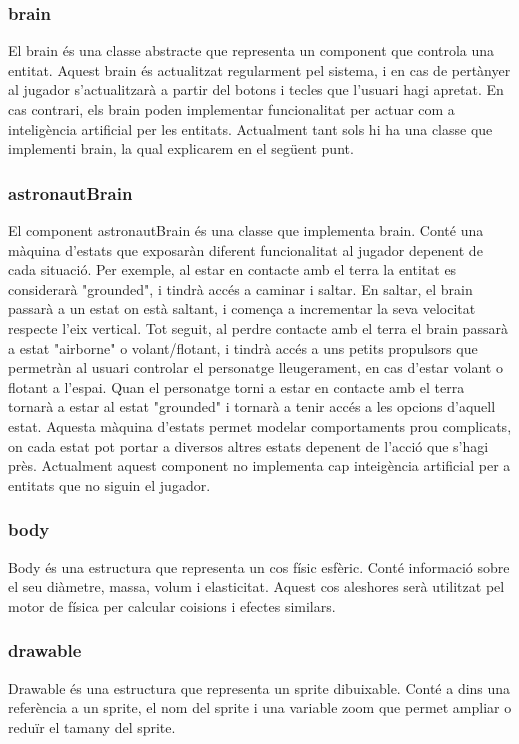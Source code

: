\subsubsection{brain}
El brain és una classe abstracte que representa un component que controla una entitat. Aquest brain és actualitzat regularment pel sistema, i en cas de pertànyer al jugador s'actualitzarà a partir del botons i tecles que l'usuari hagi apretat.
En cas contrari, els brain poden implementar funcionalitat per actuar com a inteligència artificial per les entitats.
Actualment tant sols hi ha una classe que implementi brain, la qual explicarem en el següent punt.
\subsubsection{astronautBrain}
El component astronautBrain és una classe que implementa brain. Conté una màquina d'estats que exposaràn diferent funcionalitat al jugador depenent de cada situació.
Per exemple, al estar en contacte amb el terra la entitat es considerarà "grounded", i tindrà accés a caminar i saltar. 
En saltar, el brain passarà a un estat on està saltant, i comença a incrementar la seva velocitat respecte l'eix vertical.
Tot seguit, al perdre contacte amb el terra el brain passarà a estat "airborne" o volant/flotant, i tindrà accés a uns petits propulsors que permetràn al usuari controlar el personatge lleugerament, en cas d'estar volant o flotant a l'espai.
Quan el personatge torni a estar en contacte amb el terra tornarà a estar al estat "grounded" i tornarà a tenir accés a les opcions d'aquell estat.
Aquesta màquina d'estats permet modelar comportaments prou complicats, on cada estat pot portar a diversos altres estats depenent de l'acció que s'hagi près.
Actualment aquest component no implementa cap inte\lgem igència artificial per a entitats que no siguin el jugador.
\subsubsection{body}
Body és una estructura que representa un cos físic esfèric. Conté informació sobre el seu diàmetre, massa, volum i elasticitat. Aquest cos aleshores serà utilitzat pel motor de física per calcular co\lgem isions i efectes similars.
\subsubsection{drawable}
Drawable és una estructura que representa un sprite dibuixable. Conté a dins una referència a un sprite, el nom del sprite i una variable zoom que permet ampliar o reduïr el tamany del sprite.

